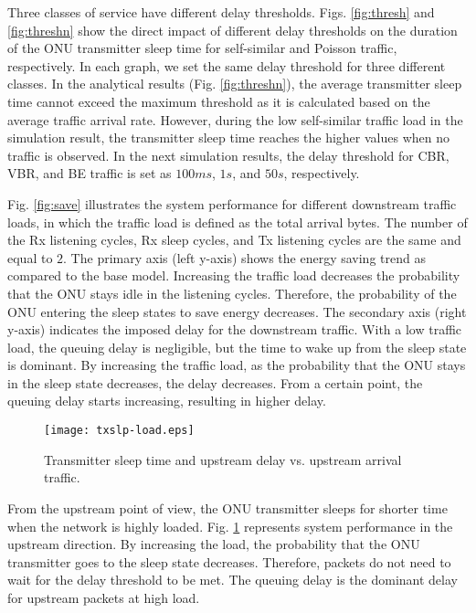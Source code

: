 \documentclass[11pt,english,12pt,onecolumn, draftcls]{IEEEtran}
\theoremstyle{plain}
\theoremstyle{definition}
\begin{document}
Three classes of service have different delay thresholds. Figs. \ref{fig:thresh} and \ref{fig:threshn} show the direct impact of different delay thresholds on the duration of the ONU transmitter sleep time for self-similar and Poisson traffic, respectively. In each graph, we set the same delay threshold for three different classes. In the analytical results (Fig. \ref{fig:threshn}), the average transmitter sleep time cannot exceed the maximum threshold as it is calculated based on the average traffic arrival rate. However, during the low self-similar traffic load in the simulation result, the transmitter sleep time reaches the higher values when no traffic is observed. In the next simulation results, the delay threshold for CBR, VBR, and BE traffic is set as $100ms$, $1s$, and $50s$, respectively.


Fig. \ref{fig:save} illustrates the system performance for different downstream traffic loads, in which the traffic load is defined as the total arrival bytes. The number of the Rx listening cycles, Rx sleep cycles, and Tx listening cycles are the same and equal to $2$. The primary axis (left y-axis) shows the energy saving trend as compared to the base model. Increasing the traffic load decreases the probability that the ONU stays idle in the listening cycles. Therefore, the probability of the ONU entering the sleep states to save energy decreases. The secondary axis (right y-axis) indicates the imposed delay for the downstream traffic. With a low traffic load, the queuing delay is negligible, but the time to wake up from the sleep state is dominant. By increasing the traffic load, as the probability that the ONU stays in the sleep state decreases, the delay decreases. From a certain point, the queuing delay starts increasing, resulting in higher delay.

\vspace{-.15in}
\begin{figure}
\centering
\texttt{[image: txslp-load.eps]}
\caption{Transmitter sleep time and upstream delay vs. upstream arrival traffic.}
\label{fig:ts-load}
\vspace{-.2in}
\end{figure}
\vspace{.2in}

From the upstream point of view, the ONU transmitter sleeps for shorter time when the network is highly loaded. Fig. \ref{fig:ts-load} represents system performance in the upstream direction. By increasing the load, the probability that the ONU transmitter goes to the sleep state decreases. Therefore, packets do not need to wait for the delay threshold to be met. The queuing delay is the dominant delay for upstream packets at high load.
\end{document}

